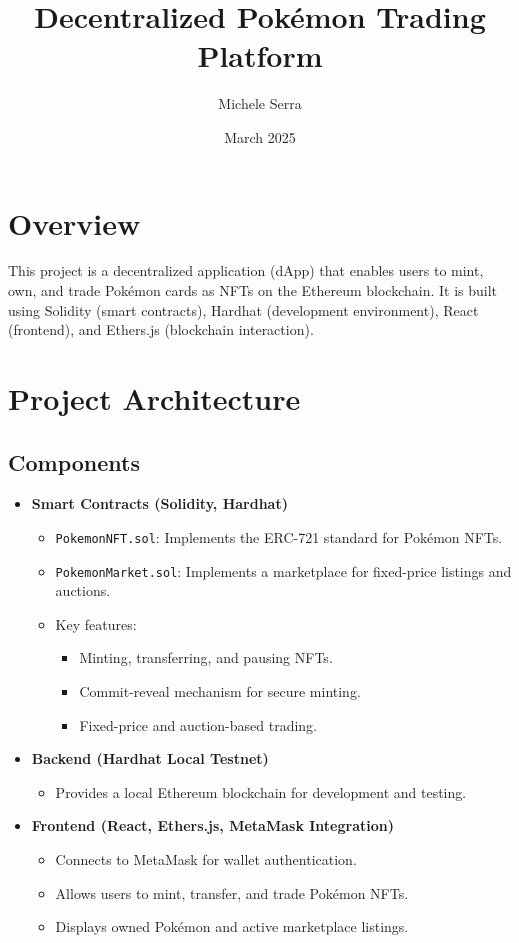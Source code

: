 \documentclass{article}
\title{Decentralized Pokémon Trading Platform}
\author{Michele Serra}
\date{March 2025}
\begin{document}
\maketitle

\section{Overview}
This project is a decentralized application (dApp) that enables users to mint, own, and trade Pokémon cards as NFTs on the Ethereum blockchain. It is built using Solidity (smart contracts), Hardhat (development environment), React (frontend), and Ethers.js (blockchain interaction).

\section{Project Architecture}
\subsection{Components}
\begin{itemize}
    \item \textbf{Smart Contracts (Solidity, Hardhat)}
    \begin{itemize}
        \item \texttt{PokemonNFT.sol}: Implements the ERC-721 standard for Pokémon NFTs.
        \item \texttt{PokemonMarket.sol}: Implements a marketplace for fixed-price listings and auctions.
        \item Key features:
        \begin{itemize}
            \item Minting, transferring, and pausing NFTs.
            \item Commit-reveal mechanism for secure minting.
            \item Fixed-price and auction-based trading.
        \end{itemize}
    \end{itemize}
    
    \item \textbf{Backend (Hardhat Local Testnet)}
    \begin{itemize}
        \item Provides a local Ethereum blockchain for development and testing.
    \end{itemize}
    
    \item \textbf{Frontend (React, Ethers.js, MetaMask Integration)}
    \begin{itemize}
        \item Connects to MetaMask for wallet authentication.
        \item Allows users to mint, transfer, and trade Pokémon NFTs.
        \item Displays owned Pokémon and active marketplace listings.
    \end{itemize}
\end{itemize}
\end{document}
